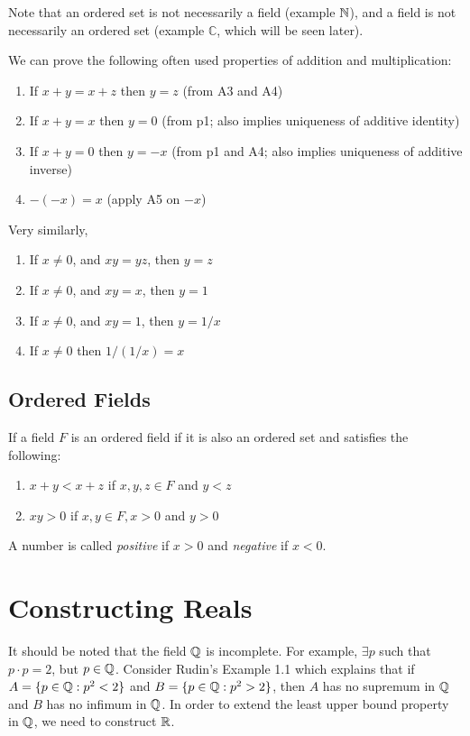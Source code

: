 Note that an ordered set is not necessarily a field (example $\mathbb{N}$), and a field is not necessarily an ordered set (example $\mathbb{C}$, which will be seen later).

We can prove the following often used properties of addition and multiplication:
\begin{enumerate}[label=(a\arabic*)]
\item If $x+y=x+z$ then $y=z$ (from A3 and A4)
\item If $x+y=x$ then $y=0$ (from p1; also implies uniqueness of additive identity)
\item If $x+y=0$ then $y=-x$ (from p1 and A4; also implies uniqueness of additive inverse)
\item $-(-x)=x$ (apply A5 on $-x$)
\end{enumerate}
Very similarly,
\begin{enumerate}[label=(m\arabic*)]
\item If $x\neq0$, and $xy=yz$, then $y=z$
\item If $x\neq0$, and $xy=x$, then $y=1$
\item If $x\neq0$, and $xy=1$, then $y=1/x$
\item If $x\neq0$ then $1/(1/x)=x$
\end{enumerate}

\subsection{Ordered Fields}
If a field $F$ is an ordered field if it is also an ordered set and satisfies the following:
\begin{enumerate}[label=(OF\arabic*)]
\item $x+y<x+z$ if $x,y,z\in F$ and $y<z$
\item $xy>0$ if $x,y\in F,x>0$ and $y>0$
\end{enumerate}
A number is called \textit{positive} if $x>0$ and \textit{negative} if $x<0$.

\section{Constructing Reals}
It should be noted that the field $\mathbb{Q}$ is incomplete. For example, $\exists p$ such that $p\cdot p=2$, but $p\in \mathbb{Q}$. Consider Rudin's Example 1.1 which explains that if $A=\{p\in\mathbb{Q}:p^2<2\}$ and $B=\{p\in\mathbb{Q}:p^2>2\}$, then $A$ has no supremum in $\mathbb{Q}$ and $B$ has no infimum in $\mathbb{Q}$. In order to extend the least upper bound property in $\mathbb{Q}$, we need to construct $\mathbb{R}$.

